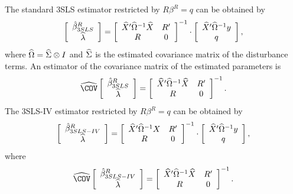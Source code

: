 The standard 3SLS estimator restricted by $R \beta^R = q$ can be obtained by
\begin{equation}
   \left[ \begin{array}{c}
      \hat{\beta}^R_{3SLS} \\ \widehat{\lambda}
   \end{array} \right]
   =
   \left[ \begin{array}{cc}
      \widehat{X}' \widehat{\Omega}^{-1} \widehat{X} & R' \\
      R & 0
   \end{array} \right]^{-1}
   \cdot
   \left[ \begin{array}{c}
      \widehat{X}' \widehat{\Omega}^{-1} y \\ q
   \end{array} \right] ,
   \label{eq:3slsGlsR}
\end{equation}
where $\widehat{\Omega} = \widehat{\Sigma} \otimes I$ and
$\widehat{\Sigma}$ is the estimated covariance matrix of the disturbance terms.
An estimator of the covariance matrix of the estimated parameters is
\begin{equation}
   \COVHat
   \left[ \begin{array}{c}
      \bHat^R_{3SLS} \\ \widehat{\lambda}
   \end{array} \right] 
   = 
   \left[ \begin{array}{cc}
      \widehat{X}' \OHat^{-1} \widehat{X} & R' \\
      R & 0
   \end{array} \right]^{-1} .
   \label{eq:cov3slsr}
\end{equation}
The 3SLS-IV estimator restricted by $R \beta^R = q$ can be obtained by
\begin{equation}
   \left[ \begin{array}{c}
      \hat{\beta}^R_{3SLS-IV} \\ \widehat{\lambda}
   \end{array} \right]
   =
   \left[ \begin{array}{cc}
      \widehat{X}' \widehat{\Omega}^{-1} X & R' \\
      R & 0
   \end{array} \right]^{-1}
   \cdot
   \left[ \begin{array}{c}
      \widehat{X}' \widehat{\Omega}^{-1} y \\ q
   \end{array} \right] ,
   \label{eq:3slsIvR}
\end{equation}
where
\begin{equation}
   \COVHat
   \left[ \begin{array}{c}
      \bHat^R_{3SLS-IV} \\ \widehat{\lambda}
   \end{array} \right] 
   = 
   \left[ \begin{array}{cc}
      \widehat{X}' \OHat^{-1} \widehat{X} & R' \\
      R & 0
   \end{array} \right]^{-1} .
\end{equation}
